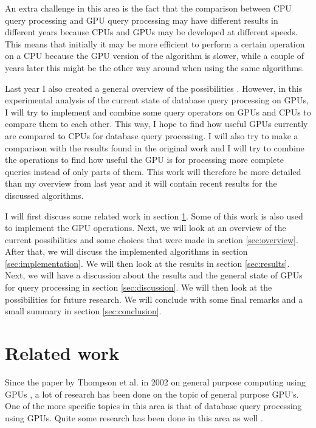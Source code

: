 \documentclass[a4paper,titlepage]{article}
\begin{document}
An extra challenge in this area is the fact that the comparison between CPU query processing and GPU query processing may have different results in different years because CPUs and GPUs may be developed at different speeds. This means that initially it may be more efficient to perform a certain operation on a CPU because the GPU version of the algorithm is slower, while a couple of years later this might be the other way around when using the same algorithms.

Last year I also created a general overview of the possibilities \cite{kostjens2015}. However, in this experimental analysis of the current state of database query processing on GPUs, I will try to implement and combine some query operators on GPUs and CPUs to compare them to each other. This way, I hope to find how useful GPUs currently are compared to CPUs for database query processing. I will also try to make a comparison with the results found in the original work and I will try to combine the operations to find how useful the GPU is for processing more complete queries instead of only parts of them. This work will therefore be more detailed than my overview from last year and it will contain recent results for the discussed algorithms.

I will first discuss some related work in section \ref{sec:related-work}. Some of this work is also used to implement the GPU operations. Next, we will look at an overview of the current possibilities and some choices that were made in section \ref{sec:overview}. After that, we will discuss the implemented algorithms in section \ref{sec:implementation}. We will then look at the results in section \ref{sec:results}. Next, we will have a discussion about the results and the general state of GPUs for query processing in section \ref{sec:discussion}. We will then look at the possibilities for future research. We will conclude with some final remarks and a small summary in section \ref{sec:conclusion}.

\section{Related work}
\label{sec:related-work}
Since the paper by Thompson et al. in 2002 on general purpose computing using GPUs \cite{thompson2002}, a lot of research has been done on the topic of general purpose GPU's. One of the more specific topics in this area is that of database query processing using GPUs. Quite some research has been done in this area as well \cite{bakkum2010,fang2007,kaldeway2010}. 
\end{document}
